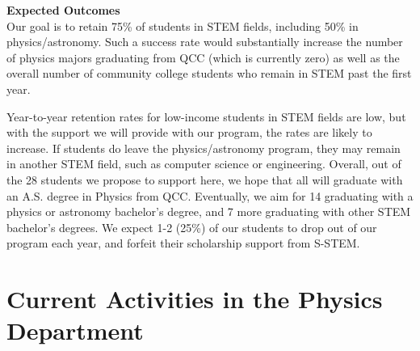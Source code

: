\documentclass[12pt]{article}
\newcommand\reword[1]{{\color{red}#1}}
\begin{document}
\noindent
{\bf Expected Outcomes}\\
\noindent
Our goal is to retain 75\% of students in STEM fields, including 50\% in physics/astronomy.  Such a success rate would substantially increase the number of physics majors graduating from QCC (which is currently zero) as well as the overall number of community college students who remain in STEM past the first year.  


Year-to-year retention rates for low-income students in STEM fields are low, but with the support we will provide with our program, the rates are likely to increase.  If students do leave the physics/astronomy program, they may remain in another STEM field, such as computer science or engineering.  Overall, out of the 28 students we propose to support here, we hope that all will graduate with an A.S. degree in Physics from QCC.  Eventually, we aim for 14 graduating with a physics or astronomy bachelor's degree, and 7 more graduating with other STEM bachelor's degrees.  We expect 1-2 (25\%) of our students to drop out of our program each year, and forfeit their scholarship support from S-STEM.
\vspace{-5mm}


\section{Current Activities in the Physics Department}
\vspace{-3mm}
\end{document}
